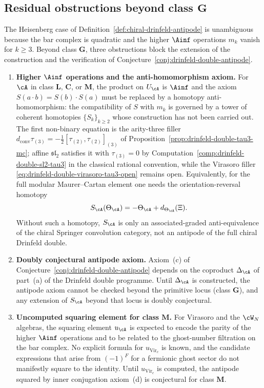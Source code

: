 \subsection{Residual obstructions beyond class $\mathbf{G}$}
\label{subsec:antipode-obstructions}

The Heisenberg case of Definition~\ref{def:chiral-drinfeld-antipode}
is unambiguous because the bar complex is quadratic and the higher
$\Ainf$ operations $m_k$ vanish for $k \ge 3$. Beyond class
$\mathbf{G}$, three obstructions block the extension of the
construction and the verification of Conjecture~\ref{conj:drinfeld-double-antipode}.

\begin{enumerate}
\item \textbf{Higher $\Ainf$ operations and the anti-homomorphism
axiom.} For $\cA$ in class $\mathbf{L}$, $\mathbf{C}$, or
$\mathbf{M}$, the product on $U_\cA$ is $\Ainf$ and the axiom
$S(a \cdot b) = S(b) \cdot S(a)$ must be replaced by a homotopy
anti-homomorphism: the compatibility of $S$ with $m_k$ is governed
by a tower of coherent homotopies $\{S_k\}_{k \ge 2}$ whose
construction has not been carried out. The first non-binary equation
is the arity-three filler
$d_{\mathrm{conv}}\tau_{(3)}
=-\frac12[\tau_{(2)},\tau_{(2)}]_{(3)}$ of
Proposition~\ref{prop:drinfeld-double-tau3-mc}; affine
$\mathfrak{sl}_2$ satisfies it with $\tau_{(3)}=0$ by
Computation~\ref{comp:drinfeld-double-sl2-tau3} in the classical
rational convention, while the Virasoro filler
\eqref{eq:drinfeld-double-virasoro-tau3-open} remains open.
Equivalently, for the full modular Maurer--Cartan element one needs
the orientation-reversal homotopy
\[
S_{\cA}(\Theta_{\cA})=-\Theta_{\cA}+d_{\Theta_{\cA}}(\Xi).
\]
Without such a homotopy, \(S_{\cA}\) is only an
associated-graded anti-equivalence of the chiral Springer convolution
category, not an antipode of the full chiral Drinfeld double.
\item \textbf{Doubly conjectural antipode axiom.} Axiom~(c) of
Conjecture~\ref{conj:drinfeld-double-antipode} depends on the
coproduct $\Delta_\cA$ of part~(a) of the Drinfeld double
programme. Until $\Delta_\cA$ is constructed, the antipode axiom
cannot be checked beyond the primitive locus (class $\mathbf{G}$),
and any extension of $S_\cA$ beyond that locus is doubly
conjectural.
\item \textbf{Uncomputed squaring element for class $\mathbf{M}$.}
For Virasoro and the $\cW_N$ algebras, the squaring element
$u_\cA$ is expected to encode the parity of the higher $\Ainf$
operations and to be related to the ghost-number filtration on
the bar complex. No explicit formula for $u_{\mathrm{Vir}_c}$
is known, and the candidate expressions that arise from
$(-1)^{F}$ for a fermionic ghost sector do not manifestly square
to the identity. Until $u_{\mathrm{Vir}_c}$ is computed, the
antipode squared by inner conjugation axiom~(d) is conjectural for class $\mathbf{M}$.
\end{enumerate}

